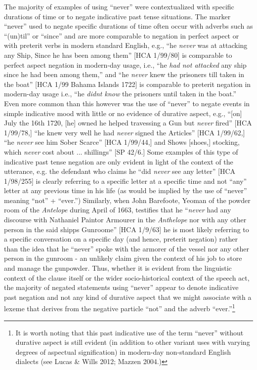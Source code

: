 \begin{styleStandard}
The majority of examples of using “never” were contextualized with specific durations of time or to negate indicative past tense situations. The marker “never” used to negate specific durations of time often occur with adverbs such as “(un)til” or “since” and are more comparable to negation in perfect aspect or with preterit verbs in modern standard English, e.g., “he \textit{never }was at attacking any Ship, Since he has been among them” [HCA 1/99/80] is comparable to perfect aspect negation in modern-day usage, i.e., “he \textit{had not attacked} any ship since he had been among them,” and “he \textit{never} knew the prisoners till taken in the boat” [HCA 1/99 Bahama Islands 1722] is comparable to preterit negation in modern-day usage i.e., “he \textit{didn{\textquotesingle}t know} the prisoners until taken in the boat.” Even more common than this however was the use of “never” to negate events in simple indicative mood with little or no evidence of durative aspect, e.g., “[on] July the 16th 1720, [he] owned he helped travessing a Gun but \textit{never} fired” [HCA 1/99/78,] “he knew very well he had \textit{never }signed the Articles” [HCA 1/99/62,] “he \textit{never} see him Sober Scarce” [HCA 1/99/44,] and {\textquotedbl}Shows [shoes,] stocking, which \textit{never} cost about ... shillings” [SP 42/6.] Some examples of this type of indicative past tense negation are only evident in light of the context of the utterance, e.g. the defendant who claims he “did \textit{never} see any letter” [HCA 1/98/255] is clearly referring to a specific letter at a specific time and not “any” letter at any previous time in his life (as would be implied by the use of “never” meaning “not” + “ever.”) Similarly, when John Barefoote, Yeoman of the powder room of the \textit{Antelope} during April of 1663, testifies that he “\textit{never }had any discourse with Nathaniel Paintor Armourer in the \textit{Anthelope} nor with any other person in the said shipps Gunroome” [HCA 1/9/63] he is most likely referring to a specific conversation on a specific day (and hence, preterit negation) rather than the idea that he “never” spoke with the armorer of the vessel nor any other person in the gunroom - an unlikely claim given the context of his job to store and manage the gunpowder. Thus, whether it is evident from the linguistic context of the clause itself or the wider socio-historical context of the speech act, the majority of negated statements using “never” appear to denote indicative past negation and not any kind of durative aspect that we might associate with a lexeme that derives from the negative particle “not” and the adverb “ever.”\footnote{ It is worth noting that this past indicative use of the term “never” without durative aspect is still evident (in addition to other variant uses with varying degrees of aspectual signification) in modern-day non-standard English dialects (see Lucas \& Wills 2012; Mazzen 2004.) } 
\end{styleStandard}


